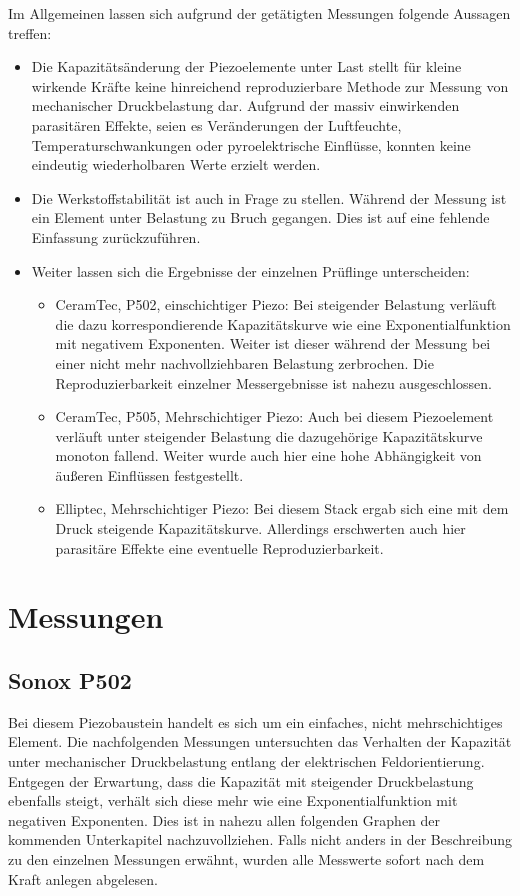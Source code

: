 \documentclass[12pt]{scrreprt} %
\begin{document}
Im Allgemeinen lassen sich aufgrund der getätigten Messungen folgende Aussagen treffen:
\begin{itemize}
\item
Die Kapazitätsänderung der Piezoelemente unter Last stellt für kleine wirkende Kräfte keine hinreichend reproduzierbare Methode zur Messung von mechanischer Druckbelastung dar. Aufgrund der massiv einwirkenden parasitären Effekte, seien es Veränderungen der Luftfeuchte, Temperaturschwankungen oder pyroelektrische Einflüsse, konnten keine eindeutig wiederholbaren Werte erzielt werden.
\item
Die Werkstoffstabilität ist auch in Frage zu stellen. Während der Messung ist ein Element unter Belastung zu Bruch gegangen. Dies ist auf eine fehlende Einfassung zurückzuführen.
\item
Weiter lassen sich die Ergebnisse der einzelnen Prüflinge unterscheiden:
\begin{itemize}
\item
CeramTec, P502, einschichtiger Piezo: Bei steigender Belastung verläuft die dazu korrespondierende Kapazitätskurve wie eine Exponentialfunktion mit negativem Exponenten. Weiter ist dieser während der Messung bei einer nicht mehr nachvollziehbaren Belastung zerbrochen. Die Reproduzierbarkeit einzelner Messergebnisse ist nahezu ausgeschlossen.
\item
CeramTec, P505, Mehrschichtiger Piezo: Auch bei diesem Piezoelement verläuft unter steigender Belastung die dazugehörige Kapazitätskurve monoton fallend. Weiter wurde auch hier eine hohe Abhängigkeit von äußeren Einflüssen festgestellt.
\item
Elliptec, Mehrschichtiger Piezo: Bei diesem Stack ergab sich eine mit dem Druck steigende Kapazitätskurve. Allerdings erschwerten auch hier parasitäre Effekte eine eventuelle Reproduzierbarkeit.
\end{itemize}
\end{itemize}


\section{Messungen}

\subsection{Sonox P502} 
Bei diesem Piezobaustein handelt es sich um ein einfaches, nicht mehrschichtiges Element. Die nachfolgenden Messungen untersuchten das Verhalten der Kapazität unter mechanischer Druckbelastung entlang der elektrischen Feldorientierung. Entgegen der Erwartung, dass die Kapazität mit steigender Druckbelastung ebenfalls steigt, verhält sich diese mehr wie eine Exponentialfunktion mit negativen Exponenten. Dies ist in nahezu allen folgenden Graphen der kommenden Unterkapitel nachzuvollziehen. Falls nicht anders in der Beschreibung zu den einzelnen Messungen erwähnt, wurden alle Messwerte sofort nach dem Kraft anlegen abgelesen.
\end{document}
